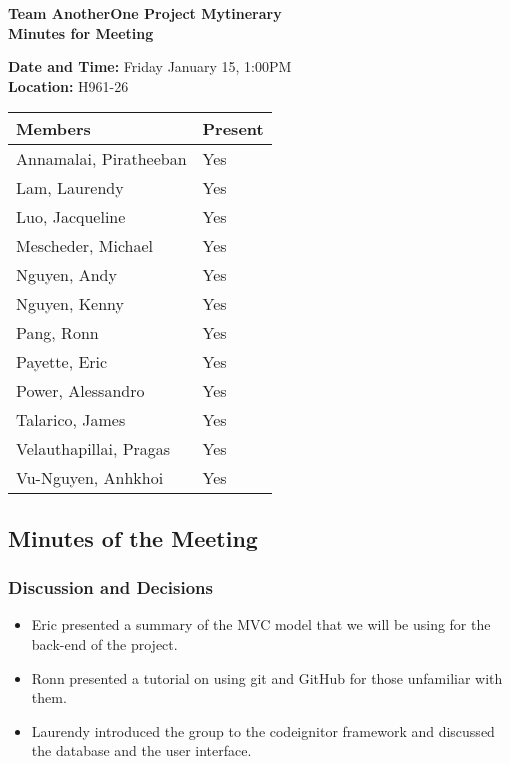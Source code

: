 \documentclass[paper=a4, fontsize=11pt]{scrartcl}
\begin{document}
\thispagestyle{empty}

\begin{center}
\textbf{Team AnotherOne \qquad Project Mytinerary \\ Minutes for Meeting}
\vspace{0.33cm}
\end{center}

\textbf{Date and Time: } Friday January 15, 1:00PM \\
\textbf{Location: } H961-26 \\

\begin{center}
\begin{tabular}{| m{4cm} | m{4cm} |} \hline
\textbf{Members} & \textbf{Present} \\ \hline
Annamalai, Piratheeban & Yes \\ \hline
Lam, Laurendy          & Yes \\ \hline
Luo, Jacqueline        & Yes \\ \hline
Mescheder, Michael     & Yes \\ \hline
Nguyen, Andy           & Yes \\ \hline
Nguyen, Kenny          & Yes \\ \hline
Pang, Ronn             & Yes \\ \hline
Payette, Eric          & Yes \\ \hline
Power, Alessandro      & Yes \\ \hline
Talarico, James        & Yes \\ \hline
Velauthapillai, Pragas & Yes \\ \hline
Vu-Nguyen, Anhkhoi     & Yes \\ \hline
\end{tabular}
\end{center}

\subsection*{Minutes of the Meeting}
\subsubsection*{Discussion and Decisions}
\begin{itemize}
    \item Eric presented a summary of the MVC model that we will be using for the back-end of the project.
    \item Ronn presented a tutorial on using git and GitHub for those unfamiliar with them.
    \item Laurendy introduced the group to the codeignitor framework and discussed the database and the user interface.
\end{itemize}
\end{document}
